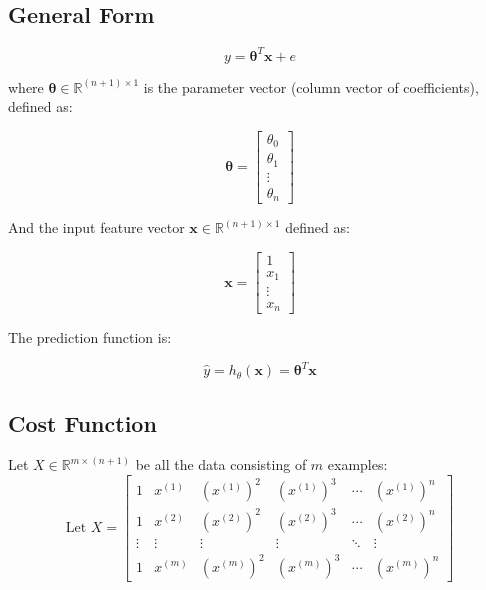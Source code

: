 \subsection{General Form}

\begin{equation}
    y = \boldsymbol{\theta}^T \mathbf{x} + e
\end{equation}

where $ \boldsymbol{\theta} \in \mathbb{R}^{(n+1) \times 1}$ is the parameter vector (column vector of coefficients), defined as:

\begin{equation}
    \boldsymbol{\theta} =
     \begin{bmatrix}
     \theta_0 \\
     \theta_1 \\
     \vdots \\
     \theta_n
     \end{bmatrix}
\end{equation}

And the input feature vector $\mathbf{x} \in \mathbb{R}^{(n+1) \times 1}$  defined as:

\begin{equation}
    \mathbf{x} = \begin{bmatrix}
                     1 \\
                    x_1 \\
                    \vdots \\
                    x_n
    \end{bmatrix}
\end{equation}

The prediction function is:

\begin{equation}
    \hat{y} = h_\theta(\mathbf{x}) = \boldsymbol{\theta}^T \mathbf{x}
\end{equation}

\subsection{Cost Function}

Let $X \in \mathbb{R}^{m \times (n+1)}$ be all the data consisting of $m$ examples:
\begin{equation}
\text{Let } X =
\begin{bmatrix}
1 & x^{(1)} & (x^{(1)})^2 & (x^{(1)})^3 & \cdots & (x^{(1)})^n \\
1 & x^{(2)} & (x^{(2)})^2 & (x^{(2)})^3 & \cdots & (x^{(2)})^n \\
\vdots & \vdots & \vdots & \vdots & \ddots & \vdots \\
1 & x^{(m)} & (x^{(m)})^2 & (x^{(m)})^3 & \cdots & (x^{(m)})^n
\end{bmatrix}
\end{equation}

